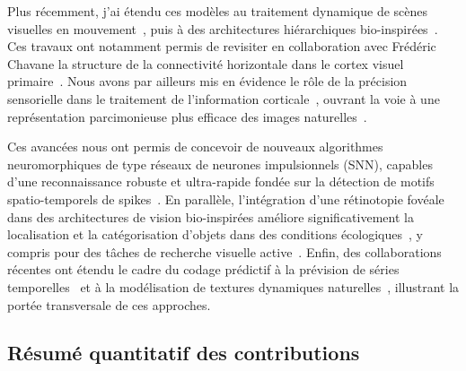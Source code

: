\documentclass[10pt,french,a4paper,oneside]{article}%
\begin{document}
Plus récemment, j'ai étendu ces modèles au traitement dynamique de scènes visuelles en mouvement~\citep{KhoeiMassonPerrinet17}, puis à des architectures hiérarchiques bio-inspirées~\citep{BoutinFranciosiniChavaneRuffierPerrinet20,Franciosini21}. Ces travaux ont notamment permis de revisiter  en collaboration avec Frédéric Chavane la structure de la connectivité horizontale dans le cortex visuel primaire~\citep{Chavane22}. Nous avons par ailleurs mis en évidence le rôle de la précision sensorielle dans le traitement de l'information corticale~\citep{Ladret23}, ouvrant la voie à une représentation parcimonieuse plus efficace des images naturelles~\citep{Ladret24sparse}.

Ces avancées nous ont permis de concevoir de nouveaux algorithmes neuromorphiques de type réseaux de neurones impulsionnels (SNN), capables d'une reconnaissance robuste et ultra-rapide fondée sur la détection de motifs spatio-temporels de spikes~\citep{Grimaldi24}. En parallèle, l'intégration d'une rétinotopie fovéale dans des architectures de vision bio-inspirées améliore significativement la localisation et la catégorisation d'objets dans des conditions écologiques~\citep{Jeremie25}, y compris pour des tâches de recherche visuelle active~\citep{Jeremie25thesis}. Enfin, des collaborations récentes ont étendu le cadre du codage prédictif à la prévision de séries temporelles~\citep{Gunasekaran25} et à la modélisation de textures dynamiques naturelles~\citep{Meso25}, illustrant la portée transversale de ces approches.

\subsection*{Résumé quantitatif des contributions}
\end{document}
